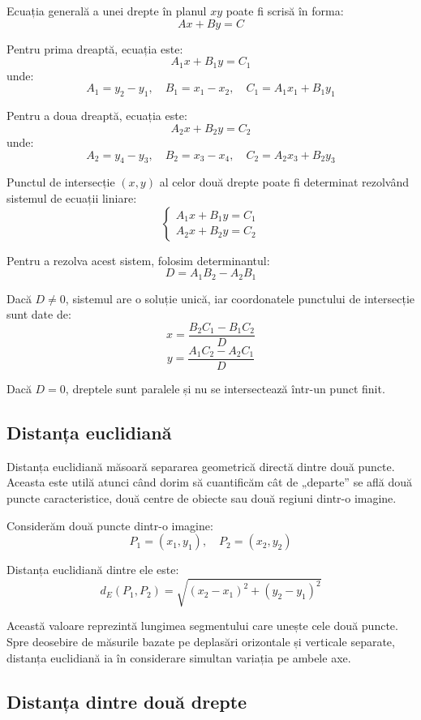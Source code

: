 Ecuația generală a unei drepte în planul $xy$ poate fi scrisă în forma:
\[
    Ax + By = C
\]

Pentru prima dreaptă, ecuația este:
\[
    A_1 x + B_1 y = C_1
\]
unde:
\[
    A_1 = y_2 - y_1, \quad B_1 = x_1 - x_2, \quad C_1 = A_1 x_1 + B_1 y_1
\]

Pentru a doua dreaptă, ecuația este:
\[
    A_2 x + B_2 y = C_2
\]
unde:
\[
    A_2 = y_4 - y_3, \quad B_2 = x_3 - x_4, \quad C_2 = A_2 x_3 + B_2 y_3
\]

Punctul de intersecție $(x, y)$ al celor două drepte poate fi determinat rezolvând sistemul de ecuații liniare:
\[
    \begin{cases}
        A_1 x + B_1 y = C_1 \\
        A_2 x + B_2 y = C_2
    \end{cases}
\]

Pentru a rezolva acest sistem, folosim determinantul:
\[
    D = A_1 B_2 - A_2 B_1
\]

Dacă $D \neq 0$, sistemul are o soluție unică, iar coordonatele punctului de intersecție sunt date de:
\[
    x = \frac{B_2 C_1 - B_1 C_2}{D}
\]
\[
    y = \frac{A_1 C_2 - A_2 C_1}{D}
\]

Dacă $D = 0$, dreptele sunt paralele și nu se intersectează într-un punct finit.

\subsection*{Distanța euclidiană}

Distanța euclidiană măsoară separarea geometrică directă dintre două puncte. Aceasta este utilă atunci când dorim să cuantificăm cât de „departe” se află două puncte caracteristice, două centre de obiecte sau două regiuni dintr-o imagine.

Considerăm două puncte dintr-o imagine:
\[
    P_1 = (x_1, y_1), \quad P_2 = (x_2, y_2)
\]

Distanța euclidiană dintre ele este:
\[
    d_E(P_1, P_2) =
    \sqrt{(x_2 - x_1)^2 + (y_2 - y_1)^2}
\]

Această valoare reprezintă lungimea segmentului care unește cele două puncte. Spre deosebire de măsurile bazate pe deplasări orizontale și verticale separate, distanța euclidiană ia în considerare simultan variația pe ambele axe.

\subsection*{Distanța dintre două drepte}

